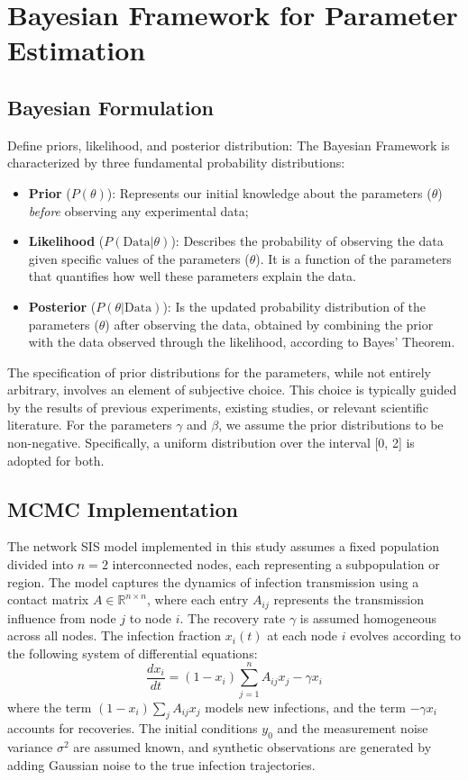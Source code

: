 \documentclass[a4paper,10pt]{report}
\begin{document}
\section{Bayesian Framework for Parameter Estimation}
\subsection{Bayesian Formulation}
Define priors, likelihood, and posterior distribution:
The Bayesian Framework is characterized by three fundamental probability distributions:
\begin{itemize}
    \item \textbf{Prior} ($P(\theta)$): Represents our initial knowledge about the parameters ($\theta$) \emph{before} observing any experimental data;
    \item \textbf{Likelihood} ($P(\text{Data}|\theta)$): Describes the probability of observing the data given specific values of the parameters ($\theta$). It is a function of the parameters that quantifies how well these parameters explain the data.
    \item \textbf{Posterior} ($P(\theta|\text{Data})$): Is the updated probability distribution of the parameters ($\theta$) after observing the data, obtained by combining the prior with the data observed through the likelihood, according to Bayes' Theorem.
\end{itemize}
The specification of prior distributions for the parameters, while not entirely arbitrary, involves an element of subjective choice. This choice is typically guided by the results of previous experiments, existing studies, or relevant scientific literature. For the parameters $\gamma$ and $\beta$, we assume the prior distributions to be non-negative. Specifically, a uniform distribution over the interval [0, 2] is adopted for both.
\subsection{MCMC Implementation}

The network SIS model implemented in this study assumes a fixed population divided into $n = 2$ interconnected nodes, each representing a subpopulation or region. The model captures the dynamics of infection transmission using a contact matrix $A \in \mathbb{R}^{n \times n}$, where each entry $A_{ij}$ represents the transmission influence from node $j$ to node $i$. The recovery rate $\gamma$ is assumed homogeneous across all nodes. The infection fraction $x_i(t)$ at each node $i$ evolves according to the following system of differential equations:
\[
\frac{dx_i}{dt} = (1 - x_i) \sum_{j=1}^{n} A_{ij} x_j - \gamma x_i
\]
where the term $(1 - x_i) \sum_j A_{ij} x_j$ models new infections, and the term $-\gamma x_i$ accounts for recoveries. The initial conditions $y_0$ and the measurement noise variance $\sigma^2$ are assumed known, and synthetic observations are generated by adding Gaussian noise to the true infection trajectories.
\end{document}
